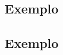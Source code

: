 \documentclass[
	12pt,				%
	openright,			%
	oneside,			%
	a4paper,			%
	chapter=TITLE,		%
	section=TITLE,		%
	subsection=TITLE,	%
	subsubsection=TITLE,%
	english,			%
	brazil				%
	]{abntex2}
\theoremstyle{definition}
\begin{document}




\begin{apendicesenv}
	
	\partapendices
	
\chapter{Exemplo}
	
\end{apendicesenv}


\begin{anexosenv}
	
	\partanexos
	
    \chapter{Exemplo}
	
\end{anexosenv}
\end{document}
